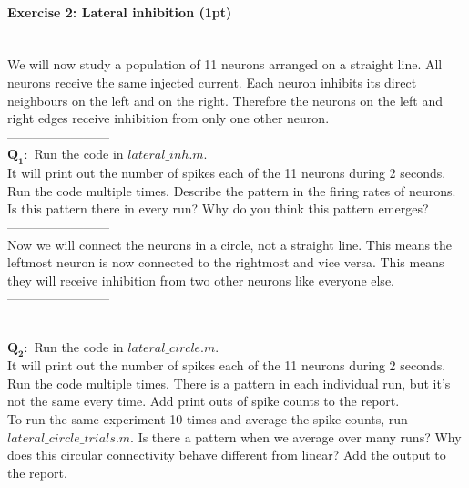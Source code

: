 \documentclass[a4paper,11pt]{article}
\newenvironment{exercise}[3]{\paragraph{Exercise #1: #2 (#3pt)}\ \\}{
\medskip}
\newcommand{\question}[2]{\setlength\parindent{10mm}\ \\$\mathbf{Q_#1:}$ #2\ \\}
\begin{document}
%
%
\begin{exercise}{2}{Lateral inhibition}{1}
We will now study a population of 11 neurons arranged on a straight line. All neurons receive the same injected current. Each neuron inhibits its direct neighbours on the left and on the right. Therefore the neurons on the left and right edges receive inhibition from only one other neuron.\\
------------------------
\question{1}{Run the code in $lateral\_inh.m$.\\ It will print out the number of spikes each of the 11 neurons during 2 seconds. Run the code multiple times. Describe the pattern in the firing rates of neurons. Is this pattern there in every run? Why do you think this pattern emerges?}
------------------------\\


Now we will connect the neurons in a circle, not a straight line. This means the leftmost neuron is now connected to the rightmost and vice versa. This means they will receive inhibition from two other neurons like everyone else.\\
------------------------

\question{2}{Run the code in $lateral\_circle.m$.\\ It will print out the number of spikes each of the 11 neurons during 2 seconds. Run the code multiple times. There is a pattern in each individual run, but it's not the same every time. Add print outs of spike counts to the report.\\
To run the same experiment 10 times and average the spike counts, run $lateral\_circle\_trials.m$. Is there a pattern when we average over many runs? Why does this circular connectivity behave different from linear?  Add the output to the report.}
\end{exercise}
\end{document}
